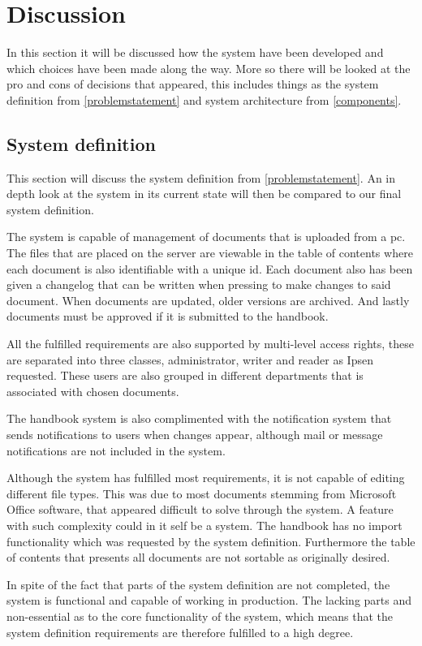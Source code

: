 \chapter{Discussion}
In this section it will be discussed how the system have been developed and which choices have been made along the way.
More so there will be looked at the pro and cons of decisions that appeared, this includes things as the system definition from \cref{problemstatement} and system architecture from \cref{components}.

\section{System definition}
This section will discuss the system definition from \cref{problemstatement}.
An in depth look at the system in its current state will then be compared to our final system definition.

The system is capable of management of documents that is uploaded from a pc.
The files that are placed on the server are viewable in the table of contents where each document is also identifiable with a unique id.
Each document also has been given a changelog that can be written when pressing to make changes to said document.
When documents are updated, older versions are archived.
And lastly documents must be approved if it is submitted to the handbook.

All the fulfilled requirements are also supported by multi-level access rights, these are separated into three classes, administrator, writer and reader as Ipsen requested.
These users are also grouped in different departments that is associated with chosen documents.

The handbook system is also complimented with the notification system that sends notifications to users when changes appear, although mail or message notifications are not included in the system.

Although the system has fulfilled most requirements, it is not capable of editing different file types.
This was due to most documents stemming from Microsoft Office software, that appeared difficult to solve through the system.
A feature with such complexity could in it self be a system.
The handbook has no import functionality which was requested by the system definition.
Furthermore the table of contents that presents all documents are not sortable as originally desired.

In spite of the fact that parts of the system definition are not completed, the system is functional and capable of working in production.
The lacking parts and non-essential as to the core functionality of the system, which means that the system definition requirements are therefore fulfilled to a high degree.

